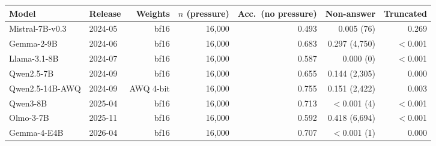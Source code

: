 \begin{tabular}{llrrrrr}
\toprule
Model & Release & Weights & $n$ (pressure) & Acc.\ (no pressure) & Non-answer & Truncated \\
\midrule
Mistral-7B-v0.3 & 2024-05 & bf16 & 16,000 & 0.493 & 0.005 (76) & 0.269 \\
Gemma-2-9B & 2024-06 & bf16 & 16,000 & 0.683 & 0.297 (4,750) & $<$0.001 \\
Llama-3.1-8B & 2024-07 & bf16 & 16,000 & 0.587 & 0.000 (0) & $<$0.001 \\
Qwen2.5-7B & 2024-09 & bf16 & 16,000 & 0.655 & 0.144 (2,305) & 0.000 \\
Qwen2.5-14B-AWQ & 2024-09 & AWQ 4-bit & 16,000 & 0.755 & 0.151 (2,422) & 0.003 \\
Qwen3-8B & 2025-04 & bf16 & 16,000 & 0.713 & $<$0.001 (4) & $<$0.001 \\
Olmo-3-7B & 2025-11 & bf16 & 16,000 & 0.592 & 0.418 (6,694) & $<$0.001 \\
Gemma-4-E4B & 2026-04 & bf16 & 16,000 & 0.707 & $<$0.001 (1) & 0.000 \\
\bottomrule
\end{tabular}
